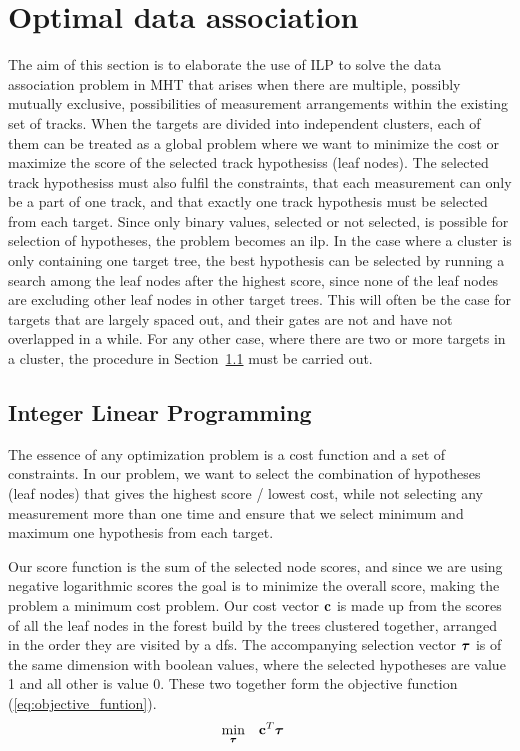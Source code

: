 \section{Optimal data association}\label{sec:optim_data_association}
The aim of this section is to elaborate the use of ILP to solve the data association problem in MHT that arises when there are multiple, possibly mutually exclusive, possibilities of measurement arrangements within the existing set of tracks. When the targets are divided into independent clusters, each of them can be treated as a global problem where we want to minimize the cost or maximize the score of the selected \glspl{track hypothesis} (leaf nodes). The selected \glspl{track hypothesis} must also fulfil the constraints, that each measurement can only be a part of one track, and that exactly one track hypothesis must be selected from each target. Since only binary values, selected or not selected, is possible for selection of hypotheses, the problem becomes an \gls{ilp}. In the case where a cluster is only containing one target tree, the best hypothesis can be selected by running a search among the leaf nodes after the highest score, since none of the leaf nodes are excluding other leaf nodes in other target trees. This will often be the case for targets that are largely spaced out, and their gates are not and have not overlapped in a while. For any other case, where there are two or more targets in a cluster, the procedure in Section~\ref{subsec:integer_linear_programming} must be carried out.

\subsection{Integer Linear Programming}\label{subsec:integer_linear_programming}
The essence of any optimization problem is a cost function and a set of constraints. In our problem, we want to select the combination of hypotheses (leaf nodes) that gives the highest score / lowest cost, while not selecting any measurement more than one time and ensure that we select minimum and maximum one hypothesis from each target. 

Our score function is the sum of the selected node scores, and since we are using negative logarithmic scores the goal is to minimize the overall score, making the problem a minimum cost problem. Our cost vector \(\boldsymbol{\mathbf{c}}\) is made up from the scores of all the leaf nodes in the forest build by the trees clustered together, arranged in the order they are visited by a \gls{dfs}. The accompanying selection vector \( \boldsymbol{\mathbf{\tau}} \) is of the same dimension with boolean values, where the selected hypotheses are value 1 and all other is value 0. These two together form the objective function (\ref{eq:objective_funtion}).
\begin{equation}
\begin{aligned}
& \underset{\boldsymbol{\mathbf{\tau}}}{\text{min}}
& & \boldsymbol{\mathbf{c}}^T \boldsymbol{\mathbf{\tau}}
\end{aligned}
\label{eq:objective_funtion}
\end{equation}


